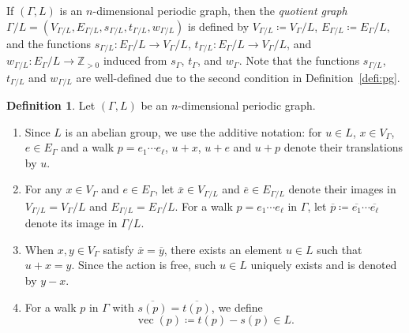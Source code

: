 \documentclass[10pt,a4paper]{amsart}
\theoremstyle{plain}
\theoremstyle{definition}
\newtheorem{defi}[cdrthm]{Definition}
\theoremstyle{remark}
\begin{document}
If $(\Gamma, L)$ is an $n$-dimensional periodic graph, 
then the \textit{quotient graph} $\Gamma /L = (V_{\Gamma/L}, E_{\Gamma/L}, s_{\Gamma/L},t_{\Gamma/L},w_{\Gamma/L})$ is defined by 
$V_{\Gamma/L} \coloneqq  V_{\Gamma} /L$, $E_{\Gamma/L} \coloneqq  E_{\Gamma} /L$, 
and the functions $s_{\Gamma/L}: E_\Gamma/L \to V_\Gamma/L$, 
$t_{\Gamma/L}: E_\Gamma/L \to V_\Gamma/L$, and 
$w_{\Gamma/L}: E_\Gamma/L \to \mathbb{Z}_{>0}$ induced from $s_{\Gamma}$, $t_{\Gamma}$, and $w_{\Gamma}$. 
Note that the functions $s_{\Gamma/L}$, $t_{\Gamma/L}$ and $w_{\Gamma/L}$ 
are well-defined due to the second condition in Definition~\ref{defi:pg}.

\begin{defi}\label{defi:peri}
Let $(\Gamma,L)$ be an $n$-dimensional periodic graph.
\begin{enumerate}
\item Since $L$ is an abelian group, we use the additive notation: 
for $u \in L$, $x \in V_{\Gamma}$, $e \in E_{\Gamma}$ and a walk $p = e_1 \cdots e_{\ell}$,
$u + x$, $u + e$ and $u + p$ denote their translations by $u$. 

\item 
For any $x \in V_{\Gamma}$ and $e \in E_{\Gamma}$, 
let $\overline{x} \in V_{\Gamma /L}$ and $\overline{e} \in E_{\Gamma /L}$ denote their images in 
$V_{\Gamma /L} = V_{\Gamma} /L$ and $E_{\Gamma /L} = E_{\Gamma} /L$. 
For a walk $p = e_1 \cdots e_{\ell}$ in $\Gamma$, 
let $\overline{p} \coloneqq  \overline{e_1} \cdots \overline{e_{\ell}}$ denote its image in $\Gamma /L$. 

\item 
When $x, y \in V_{\Gamma}$ satisfy $\overline{x} = \overline{y}$, there exists an element $u \in L$ such that $u + x = y$. 
Since the action is free, such $u \in L$ uniquely exists and is denoted by $y - x$. 

\item 
For a walk $p$ in $\Gamma$ with $\overline{s(p)} = \overline{t(p)}$, we define 
\[
\operatorname{vec}(p) \coloneqq  t(p) - s(p) \in L. 
\]
\end{enumerate}
\end{defi}
\end{document}
